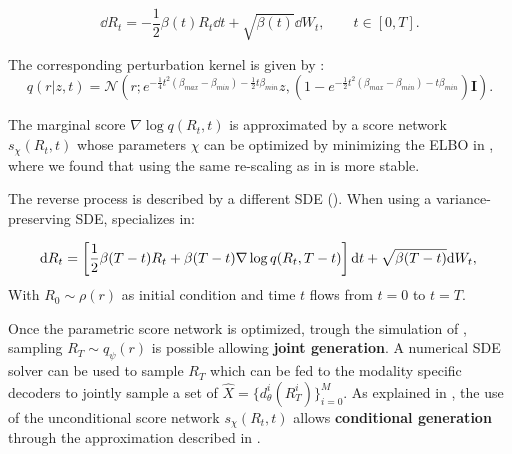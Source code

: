 \begin{equation}\label{eq:fw_sde_beta}
    \dd R_t =  -\frac{1}{2}\beta(t) R_t\dd t+ \sqrt{\beta(t)} \dd W_t, \qquad t \in [0,T].
\end{equation}

The corresponding perturbation kernel is given by :
\begin{equation}\label{eq:diffuson_kernel}
    q(r|z,t) = \mathcal{N}(r ; e^{-  \frac{1}{4}  t^2 (\beta_{max} - \beta_{min} ) - \frac{1}{2} t \beta_{min}   } z , (1-e^{-  \frac{1}{2}  t^2 (\beta_{max} - \beta_{min} ) - t \beta_{min}   } )\mathbf{I} ).
\end{equation}

The marginal score $\nabla\log q(R_{t},t)$ is approximated by a score network $ s_\chi (R_{t}, t)$ whose parameters $\chi$ can be optimized by minimizing the \gls{ELBO} in , where we found that using the same re-scaling as in \cite{Song2020} is more stable.

The reverse process is described by a different \gls{SDE} (). When using a variance-preserving \gls{SDE},  specializes in:

\begin{equation}\label{eq:reverse_sde_beta}
  \dd R_{t}  = \left[ \frac{1}{2} \beta(T-t) R_{t}  + \beta(T-t) \nabla \log q(R_{t},T-t) \right] \dd t + \sqrt{\beta(T-t)} \dd W_{t},   \\  
\end{equation}
With $R_0\sim \rho(r)$ as initial condition and time $t$ flows from $t=0$ to $t=T$.


Once the parametric score network is optimized,  trough the simulation of , sampling $R_T \sim q_\psi(r)$ is possible allowing \textbf{joint generation}. A numerical \gls{SDE} solver can be used to sample $ R_{T}$ which can be fed to the modality specific decoders to jointly sample a set of $\hat{X}=\{d^i_\theta(R^{i}_T)\}_{i= 0}^M$. 
As explained in , the use of the unconditional score network $ s_\chi (R_t, t)$ allows \textbf{conditional generation} through the approximation described in \cite{Song2020}.


